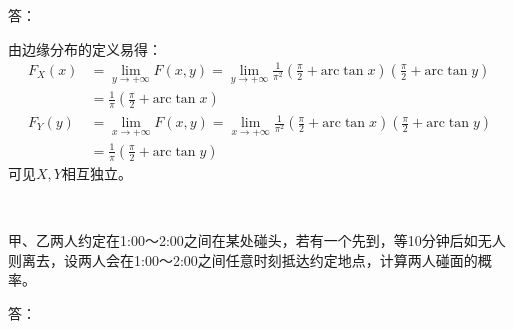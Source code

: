 答：

由边缘分布的定义易得：
\begin{align*}
F_X\left( x \right) &=\underset{y\rightarrow +\infty}{\lim}F\left( x,y \right) =\underset{y\rightarrow +\infty}{\lim}\frac{1}{\pi ^2}\left( \frac{\pi}{2}+\mathrm{arc}\tan x \right) \left( \frac{\pi}{2}+\mathrm{arc}\tan y \right) \\
&=\frac{1}{\pi}\left( \frac{\pi}{2}+\mathrm{arc}\tan x \right) \\
F_Y\left( y \right) &=\underset{x\rightarrow +\infty}{\lim}F\left( x,y \right) =\underset{x\rightarrow +\infty}{\lim}\frac{1}{\pi ^2}\left( \frac{\pi}{2}+\mathrm{arc}\tan x \right) \left( \frac{\pi}{2}+\mathrm{arc}\tan y \right) \\
&=\frac{1}{\pi}\left( \frac{\pi}{2}+\mathrm{arc}\tan y \right)
\end{align*}
可见$X,Y$相互独立。

~

\begin{example}
甲、乙两人约定在1:00～2:00之间在某处碰头，若有一个先到，等10分钟后如无人则离去，设两人会在1:00～2:00之间任意时刻抵达约定地点，计算两人碰面的概率。
\end{example}

答：

